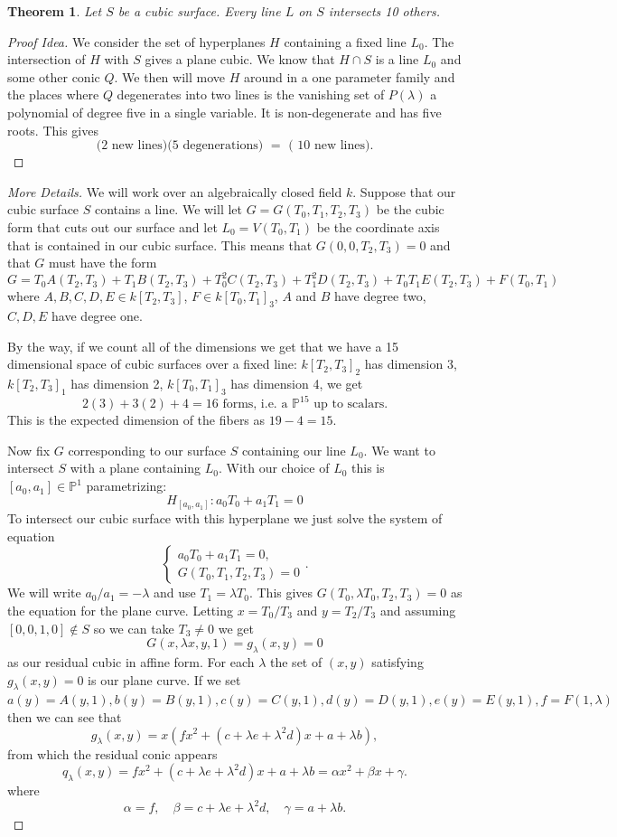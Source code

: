 \documentclass[12pt]{article}
\numberwithin{equation}{section}
\newtheorem{theorem}{Theorem}[subsection]
\theoremstyle{definition}
\theoremstyle{remark}
\newcommand{\PP}{\mathbb{P}}
\begin{document}
\begin{theorem}
	Let $S$ be a cubic surface. 
	Every line $L$ on $S$ intersects 10 others. 
\end{theorem}
\begin{proof}[Proof Idea]
	We consider the set of hyperplanes $H$ containing a fixed line $L_0$. 
	The intersection of $H$ with $S$ gives a plane cubic. 
	We know that $H\cap S$ is a line $L_0$ and some other conic $Q$. 
	We then will move $H$ around in a one parameter family and the places where $Q$ degenerates into two lines is the vanishing set of $P(\lambda)$ a polynomial of degree five in a single variable. 
	It is non-degenerate and has five roots. 
	This gives 
	 $$  \mbox{ ($2$ new lines)($5$ degenerations) } =\mbox{ ( $10$ new lines). }$$
\end{proof}
\begin{proof}[More Details]
	We will work over an algebraically closed field $k$. 
	Suppose that our cubic surface $S$ contains a line. 
	We will let $G=G(T_0,T_1,T_2,T_3)$ be the cubic form that cuts out our surface and let $L_0=V(T_0,T_1)$ be the coordinate axis that is contained in our cubic surface. 
	This means that $G(0,0,T_2,T_3)=0$ and that $G$ must have the form
	 $$ G=T_0A(T_2,T_3)+T_1B(T_2,T_3)+T_0^2C(T_2,T_3)+T_1^2D(T_2,T_3)+T_0T_1E(T_2,T_3) + F(T_0,T_1) $$
	where $A,B,C,D,E \in k[T_2,T_3]$, $F\in k[T_0,T_1]_3$, $A$ and $B$ have degree two, $C,D,E$ have degree one. 
	
	By the way, if we count all of the dimensions we get that we have a 15 dimensional space of cubic surfaces over a fixed line: $k[T_2,T_3]_2$ has dimension 3, $k[T_2,T_3]_1$ has dimension 2, $k[T_0,T_1]_3$ has dimension 4, we get  
	 $$ 2(3)+3(2)+4=16 \mbox{ forms, i.e.\ a } \PP^{15} \mbox{ up to scalars}.$$
	This is the expected dimension of the fibers as $19-4=15$. 
	
	Now fix $G$ corresponding to our surface $S$ containing our line $L_0$. 
	We want to intersect $S$ with a plane containing $L_0$. 
	With our choice of $L_0$ this is $[a_0,a_1]\in \PP^1$ parametrizing:
	 $$ H_{[a_0,a_1]}\colon a_0 T_0 + a_1 T_1 =0$$
	To intersect our cubic surface with this hyperplane we just solve the system of equation
$$	\begin{cases}
		a_0T_0+a_1T_1=0,\\
		G(T_0,T_1,T_2,T_3)=0
	\end{cases}.
	$$
	We will write $a_0/a_1=-\lambda$ and use $T_1=\lambda T_0$.
	This gives $G(T_0,\lambda T_0,T_2,T_3)=0$ as the equation for the plane curve. 
	Letting $x=T_0/T_3$ and $y=T_2/T_3$ and assuming $[0,0,1,0]\notin S$ so we can take $T_3\neq 0$ we get 
	 $$ G(x,\lambda x ,y,1) = g_{\lambda}(x,y)=0$$
	as our residual cubic in affine form.
	For each $\lambda$ the set of $(x,y)$ satisfying $g_{\lambda}(x,y)=0$ is our plane curve. 
	If we set $a(y) = A(y,1), b(y)=B(y,1), c(y)=C(y,1), d(y)=D(y,1), e(y)=E(y,1), f = F(1,\lambda)$ then we can see that
	 $$ g_{\lambda}(x,y) = x( f x^2 + (c+\lambda e+\lambda^2 d)x + a+\lambda b), $$
	from which the residual conic appears
	 $$ q_{\lambda}(x,y) = f x^2 + (c+\lambda e+\lambda^2 d)x + a+\lambda b = \alpha x^2 + \beta x + \gamma.$$
	where 
	 $$ \alpha = f, \quad \beta =c+\lambda e+\lambda^2 d, \quad \gamma = a+\lambda b. $$
	

\end{proof}
\end{document}
